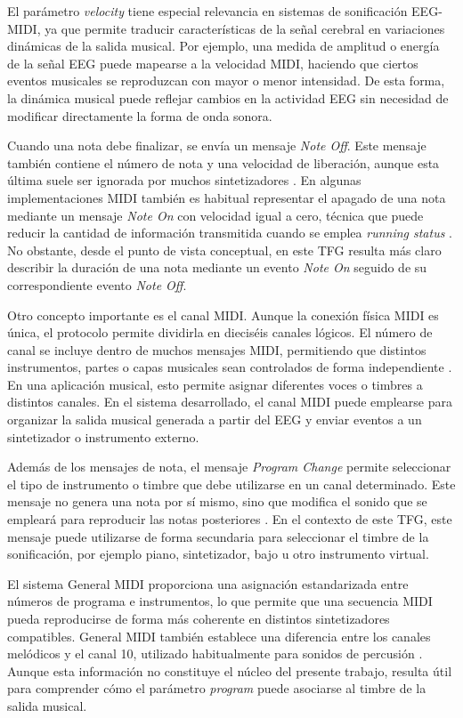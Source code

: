 \documentclass[../main.tex]{subfiles}
\begin{document}
El parámetro \textit{velocity} tiene especial relevancia en sistemas de sonificación EEG-MIDI, ya que permite traducir características de la señal cerebral en variaciones dinámicas de la salida musical. Por ejemplo, una medida de amplitud o energía de la señal EEG puede mapearse a la velocidad MIDI, haciendo que ciertos eventos musicales se reproduzcan con mayor o menor intensidad. De esta forma, la dinámica musical puede reflejar cambios en la actividad EEG sin necesidad de modificar directamente la forma de onda sonora.

Cuando una nota debe finalizar, se envía un mensaje \textit{Note Off}. Este mensaje también contiene el número de nota y una velocidad de liberación, aunque esta última suele ser ignorada por muchos sintetizadores \cite{Heckroth1995}. En algunas implementaciones MIDI también es habitual representar el apagado de una nota mediante un mensaje \textit{Note On} con velocidad igual a cero, técnica que puede reducir la cantidad de información transmitida cuando se emplea \textit{running status} \cite{Heckroth1995}. No obstante, desde el punto de vista conceptual, en este TFG resulta más claro describir la duración de una nota mediante un evento \textit{Note On} seguido de su correspondiente evento \textit{Note Off}.

Otro concepto importante es el canal MIDI. Aunque la conexión física MIDI es única, el protocolo permite dividirla en dieciséis canales lógicos. El número de canal se incluye dentro de muchos mensajes MIDI, permitiendo que distintos instrumentos, partes o capas musicales sean controlados de forma independiente \cite{Heckroth1995}. En una aplicación musical, esto permite asignar diferentes voces o timbres a distintos canales. En el sistema desarrollado, el canal MIDI puede emplearse para organizar la salida musical generada a partir del EEG y enviar eventos a un sintetizador o instrumento externo.

Además de los mensajes de nota, el mensaje \textit{Program Change} permite seleccionar el tipo de instrumento o timbre que debe utilizarse en un canal determinado. Este mensaje no genera una nota por sí mismo, sino que modifica el sonido que se empleará para reproducir las notas posteriores \cite{Heckroth1995}. En el contexto de este TFG, este mensaje puede utilizarse de forma secundaria para seleccionar el timbre de la sonificación, por ejemplo piano, sintetizador, bajo u otro instrumento virtual.

El sistema General MIDI proporciona una asignación estandarizada entre números de programa e instrumentos, lo que permite que una secuencia MIDI pueda reproducirse de forma más coherente en distintos sintetizadores compatibles. General MIDI también establece una diferencia entre los canales melódicos y el canal 10, utilizado habitualmente para sonidos de percusión \cite{Heckroth1995}. Aunque esta información no constituye el núcleo del presente trabajo, resulta útil para comprender cómo el parámetro \textit{program} puede asociarse al timbre de la salida musical.
\end{document}

